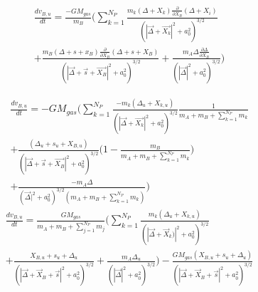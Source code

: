 \documentclass{aastex631}
\begin{document}
\begin{equation}
    \begin{split}
        \frac{dv_{B,u}}{dt}=\frac{-GM_{gas}}{m_B}\biggl(\sum_{k=1}^{N_P}\frac{m_k(\Delta+X_k)\frac{\partial}{\partial X_B}(\Delta+X_i)}{(|\vec{\Delta}+\vec{X_k}|^2+a_0^2)^{3/2}} \\
        +\frac{m_B(\Delta+s+x_B)\frac{\partial}{\partial X_B}(\Delta+s+X_B)}{(|\vec{\Delta}+\vec{s}+\vec{X_B}|^2+a_0^2)^{3/2}}+\frac{m_A\Delta\frac{\partial \Delta}{\partial X_B}}{(|\vec{\Delta}|^2+a_0^2)^{3/2}} \biggr)
    \end{split}
\end{equation}

\begin{equation}
    \begin{split}
        \frac{dv_{B,u}}{dt}=-GM_{gas}\biggl(\sum_{k=1}^{N_P}\frac{-m_k(\Delta_u+X_{k,u})}{(|\vec{\Delta}+\vec{X_k}|^2+a_0^2)^{3/2}}\frac{1}{m_A+m_B+\sum_{k=1}^{N_P}m_k} \\ 
        + \frac{(\Delta_u+s_u+X_{B,u})}{(|\vec{\Delta}+\vec{s}+\vec{X_B}|^2+a_0^2)^{3/2}}\bigl(1-\frac{m_B}{m_A+m_B+\sum_{k=1}^{N_P}m_k}\bigr)\\+\frac{-m_A\Delta}{(\vec{\Delta}|^2+a_0^2)^{3/2}(m_A+m_B+\sum_{k=1}^{N_P}m_k)}\biggr)
    \end{split}
\end{equation}
\begin{equation}
    \begin{split}
        \frac{dv_{B,u}}{dt} = \frac{GM_{gas}}{m_A+m_B+\sum_{j=1}^{N_P}m_j}\biggl(\sum_{k=1}^{N_P}\frac{m_k(\Delta_u+X_{k,u})}{(|\vec{\Delta}+\vec{X}_k)|^2+a_0^2)^{3/2}}\\ 
        + \frac{X_{B,u}+s_u+\Delta_u}{(|\vec{\Delta}+\vec{X}_B+\vec{s}|^2+a_0^2)^{3/2}} +\frac{m_A\Delta_u}{(|\vec{\Delta}|^2+a_0^2)^{3/2}}\biggr) - 
        \frac{GM_{gas}(X_{B,u}+s_u+\Delta_u)}{(|\vec{\Delta}+\vec{X}_B+\vec{s}|^2+a_0^2)^{3/2}}
    \end{split}
\end{equation}
\end{document}
